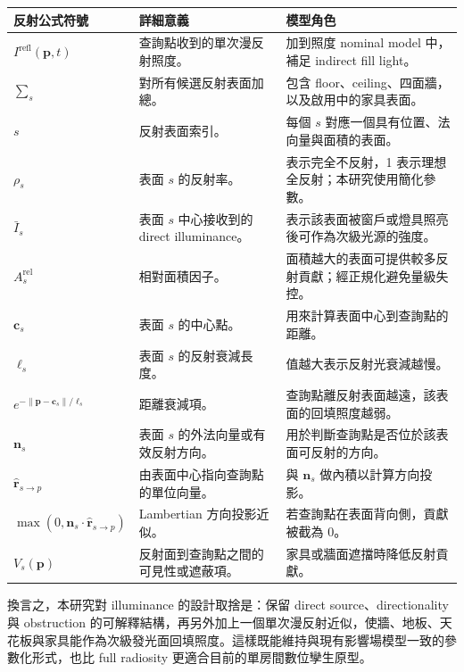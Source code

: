 \documentclass[12pt,a4paper]{article}
\begin{document}
\begin{table}[htbp]
\centering
\footnotesize
\renewcommand{\arraystretch}{1.25}
\begin{tabular}{|>{\raggedright\arraybackslash}p{}|>{\raggedright\arraybackslash}p{}|>{\raggedright\arraybackslash}p{}|}
\hline
\textbf{反射公式符號} & \textbf{詳細意義} & \textbf{模型角色} \\
\hline
$I^{\text{refl}}(\mathbf{p},t)$ & 查詢點收到的單次漫反射照度。 & 加到照度 nominal model 中，補足 indirect fill light。 \\
\hline
$\sum_s$ & 對所有候選反射表面加總。 & 包含 floor、ceiling、四面牆，以及啟用中的家具表面。 \\
\hline
$s$ & 反射表面索引。 & 每個 $s$ 對應一個具有位置、法向量與面積的表面。 \\
\hline
$\rho_s$ & 表面 $s$ 的反射率。 & 0 表示完全不反射，1 表示理想全反射；本研究使用簡化參數。 \\
\hline
$\bar{I}_s$ & 表面 $s$ 中心接收到的 direct illuminance。 & 表示該表面被窗戶或燈具照亮後可作為次級光源的強度。 \\
\hline
$A_s^{\text{rel}}$ & 相對面積因子。 & 面積越大的表面可提供較多反射貢獻；經正規化避免量級失控。 \\
\hline
$\mathbf{c}_s$ & 表面 $s$ 的中心點。 & 用來計算表面中心到查詢點的距離。 \\
\hline
$\ell_s$ & 表面 $s$ 的反射衰減長度。 & 值越大表示反射光衰減越慢。 \\
\hline
$e^{-\|\mathbf{p}-\mathbf{c}_s\|/\ell_s}$ & 距離衰減項。 & 查詢點離反射表面越遠，該表面的回填照度越弱。 \\
\hline
$\mathbf{n}_s$ & 表面 $s$ 的外法向量或有效反射方向。 & 用於判斷查詢點是否位於該表面可反射的方向。 \\
\hline
$\hat{\mathbf{r}}_{s\to p}$ & 由表面中心指向查詢點的單位向量。 & 與 $\mathbf{n}_s$ 做內積以計算方向投影。 \\
\hline
$\max(0,\mathbf{n}_s\cdot\hat{\mathbf{r}}_{s\to p})$ & Lambertian 方向投影近似。 & 若查詢點在表面背向側，貢獻被截為 0。 \\
\hline
$V_s(\mathbf{p})$ & 反射面到查詢點之間的可見性或遮蔽項。 & 家具或牆面遮擋時降低反射貢獻。 \\
\hline
\end{tabular}
\end{table}

換言之，本研究對 illuminance 的設計取捨是：保留 direct source、directionality 與 obstruction 的可解釋結構，再另外加上一個單次漫反射近似，使牆、地板、天花板與家具能作為次級發光面回填照度。這樣既能維持與現有影響場模型一致的參數化形式，也比 full radiosity 更適合目前的單房間數位孿生原型。
\end{document}
